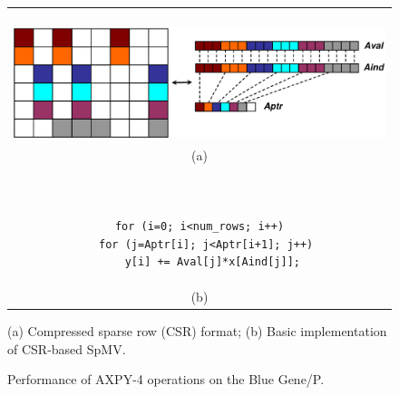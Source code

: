 \begin{figure}%
\begin{tabular}{c}
\begin{minipage}[t]{.43\textwidth}
\centering
\vspace{0.2in}
~~~~~~~~\includegraphics[width=1.0\textwidth]{figures/spmv.eps}  
\end{minipage}
\\
(a)
\\
\begin{minipage}[t]{.3\textwidth}
\scriptsize
\begin{verbatim}


for (i=0; i<num_rows; i++)
  for (j=Aptr[i]; j<Aptr[i+1]; j++)
    y[i] += Aval[j]*x[Aind[j]];

\end{verbatim}
\end{minipage}
\\
(b)
\\
\end{tabular}

\caption{(a) Compressed sparse row (CSR) format; (b) Basic implementation of CSR-based SpMV.}
\label{fig:spmv}
\end{figure}


\begin{figure}%
\begin{center} 
\end{center}
\caption{Performance of AXPY-4 operations on the Blue Gene/P.} 
\label{fig:axpy4-bgp-results} 
\end{figure} 




